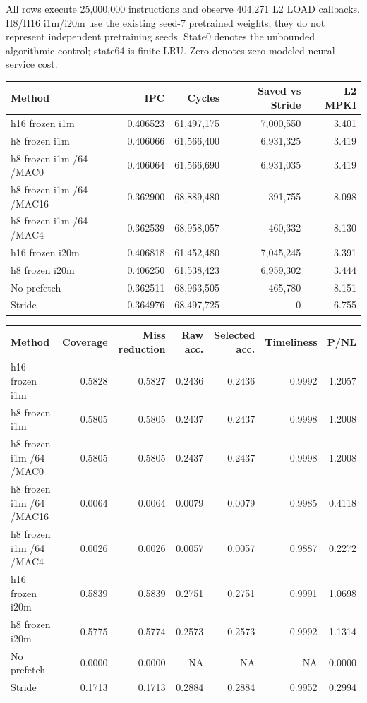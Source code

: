 \documentclass[10pt]{article}
\begin{document}
All rows execute 25,000,000 instructions and observe 404,271 L2 LOAD callbacks. H8/H16 i1m/i20m use the existing seed-7 pretrained weights; they do not represent independent pretraining seeds. State0 denotes the unbounded algorithmic control; state64 is finite LRU. Zero denotes zero modeled neural service cost.

\begin{center}
\scriptsize
\begin{tabular}{lrrrr}
\toprule
Method & IPC & Cycles & Saved vs Stride & L2 MPKI \\
\midrule
h16 frozen i1m & 0.406523 & 61,497,175 & 7,000,550 & 3.401 \\
h8 frozen i1m & 0.406066 & 61,566,400 & 6,931,325 & 3.419 \\
h8 frozen i1m /64 /MAC0 & 0.406064 & 61,566,690 & 6,931,035 & 3.419 \\
h8 frozen i1m /64 /MAC16 & 0.362900 & 68,889,480 & -391,755 & 8.098 \\
h8 frozen i1m /64 /MAC4 & 0.362539 & 68,958,057 & -460,332 & 8.130 \\
h16 frozen i20m & 0.406818 & 61,452,480 & 7,045,245 & 3.391 \\
h8 frozen i20m & 0.406250 & 61,538,423 & 6,959,302 & 3.444 \\
No prefetch & 0.362511 & 68,963,505 & -465,780 & 8.151 \\
Stride & 0.364976 & 68,497,725 & 0 & 6.755 \\
\bottomrule
\end{tabular}
\end{center}

\begin{center}
\scriptsize
\begin{tabular}{lrrrrrr}
\toprule
Method & Coverage & Miss reduction & Raw acc. & Selected acc. & Timeliness & P/NL \\
\midrule
h16 frozen i1m & 0.5828 & 0.5827 & 0.2436 & 0.2436 & 0.9992 & 1.2057 \\
h8 frozen i1m & 0.5805 & 0.5805 & 0.2437 & 0.2437 & 0.9998 & 1.2008 \\
h8 frozen i1m /64 /MAC0 & 0.5805 & 0.5805 & 0.2437 & 0.2437 & 0.9998 & 1.2008 \\
h8 frozen i1m /64 /MAC16 & 0.0064 & 0.0064 & 0.0079 & 0.0079 & 0.9985 & 0.4118 \\
h8 frozen i1m /64 /MAC4 & 0.0026 & 0.0026 & 0.0057 & 0.0057 & 0.9887 & 0.2272 \\
h16 frozen i20m & 0.5839 & 0.5839 & 0.2751 & 0.2751 & 0.9991 & 1.0698 \\
h8 frozen i20m & 0.5775 & 0.5774 & 0.2573 & 0.2573 & 0.9992 & 1.1314 \\
No prefetch & 0.0000 & 0.0000 & NA & NA & NA & 0.0000 \\
Stride & 0.1713 & 0.1713 & 0.2884 & 0.2884 & 0.9952 & 0.2994 \\
\bottomrule
\end{tabular}
\end{center}
\end{document}
